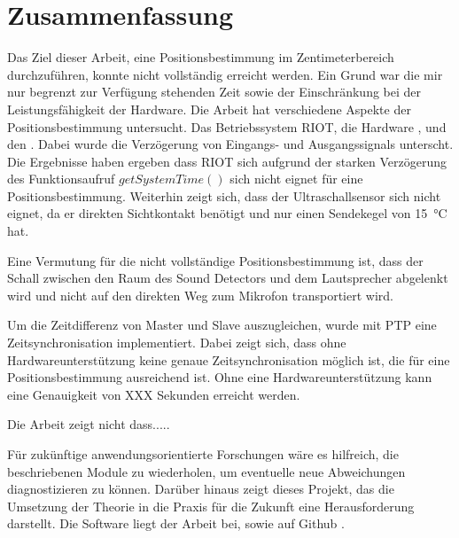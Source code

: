 \newpage
\section{Zusammenfassung}

Das Ziel dieser Arbeit, eine Positionsbestimmung im Zentimeterbereich durchzuführen, konnte nicht vollständig erreicht werden. Ein Grund war die mir nur begrenzt zur Verfügung stehenden Zeit sowie der Einschränkung bei der Leistungsfähigkeit der Hardware.
Die Arbeit hat verschiedene Aspekte der Positionsbestimmung untersucht. Das Betriebssystem RIOT, die Hardware \microphone, \platz und den \ultraschall. Dabei wurde die Verzögerung von Eingangs- und Ausgangssignals unterscht.
\\
Die Ergebnisse haben ergeben dass RIOT sich aufgrund der starken Verzögerung des Funktionsaufruf $getSystemTime()$ sich nicht eignet für eine Positionsbestimmung. Weiterhin zeigt sich, dass der Ultraschallsensor sich nicht eignet, da er direkten Sichtkontakt benötigt und nur einen Sendekegel von \SI{15}{\degreeCelsius} hat. 

Eine Vermutung für die nicht vollständige Positionsbestimmung ist, dass der Schall zwischen den Raum des Sound Detectors und dem Lautsprecher abgelenkt wird und nicht auf den direkten Weg zum Mikrofon transportiert wird. 


Um die Zeitdifferenz von Master und Slave auszugleichen, wurde mit PTP eine Zeitsynchronisation implementiert. Dabei zeigt sich, dass ohne Hardwareunterstützung keine genaue Zeitsynchronisation möglich ist, die für eine Positionsbestimmung ausreichend ist. Ohne eine Hardwareunterstützung kann eine Genauigkeit von XXX Sekunden erreicht werden.

Die Arbeit zeigt nicht dass.....



Für zukünftige anwendungsorientierte Forschungen wäre es hilfreich, die beschriebenen Module zu wiederholen, um eventuelle neue Abweichungen diagnostizieren zu können. Darüber hinaus zeigt dieses Projekt, das die Umsetzung der Theorie in die Praxis für die Zukunft eine Herausforderung darstellt. Die Software liegt der Arbeit bei, sowie auf Github \cite{src_GITHUB_CODE_BA}.

